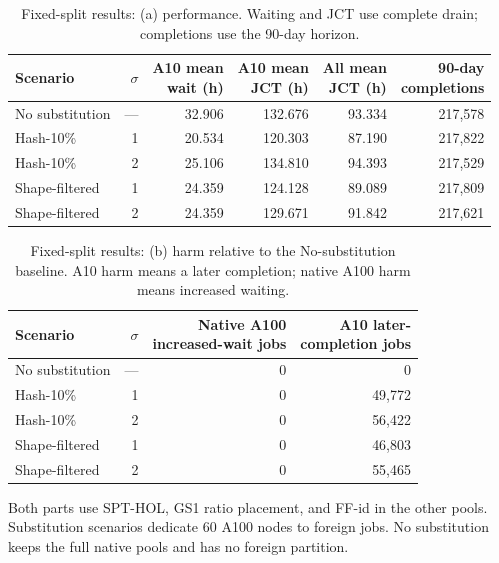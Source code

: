 \begin{table}[H]\centering
\caption{Fixed-split results: (a) performance. Waiting and JCT use complete drain; completions use the 90-day horizon.}
\label{tab:q3main}
\begin{tabular}{lrrrrr}
\toprule
Scenario & $\sigma$ & \shortstack{A10 mean\\wait (h)} & \shortstack{A10 mean\\JCT (h)} & \shortstack{All mean\\JCT (h)} & \shortstack{90-day\\completions}\\
\midrule
No substitution & --- & 32.906 & 132.676 & 93.334 & 217,578\\
Hash-10\% & 1 & 20.534 & 120.303 & 87.190 & 217,822\\
Hash-10\% & 2 & 25.106 & 134.810 & 94.393 & 217,529\\
Shape-filtered & 1 & 24.359 & 124.128 & 89.089 & 217,809\\
Shape-filtered & 2 & 24.359 & 129.671 & 91.842 & 217,621\\
\bottomrule
\end{tabular}

\end{table}
\addtocounter{table}{-1}
\begin{table}[H]\centering
\caption{Fixed-split results: (b) harm relative to the No-substitution baseline. A10 harm means a later completion; native A100 harm means increased waiting.}
\label{tab:q3harm}
\begin{tabular}{lrrr}
\toprule
Scenario & $\sigma$ & \shortstack{Native A100\\increased-wait jobs} & \shortstack{A10 later-\\completion jobs}\\
\midrule
No substitution & --- & 0 & 0\\
Hash-10\% & 1 & 0 & 49,772\\
Hash-10\% & 2 & 0 & 56,422\\
Shape-filtered & 1 & 0 & 46,803\\
Shape-filtered & 2 & 0 & 55,465\\
\bottomrule
\end{tabular}
\smallskip\par Both parts use SPT-HOL, GS1 ratio placement, and FF-id in the other pools. Substitution scenarios dedicate 60 A100 nodes to foreign jobs. No substitution keeps the full native pools and has no foreign partition.
\end{table}
